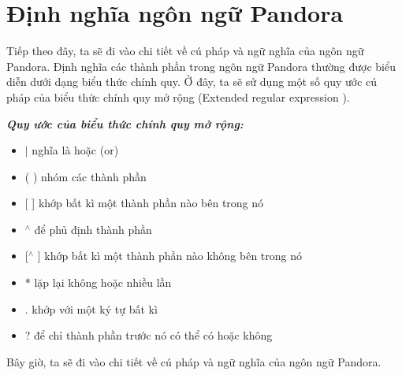 \section{Định nghĩa ngôn ngữ Pandora}

Tiếp theo đây, ta sẽ đi vào chi tiết về cú pháp và ngữ nghĩa của ngôn ngữ Pandora. Định nghĩa các thành phần trong ngôn ngữ Pandora thường được biểu diễn dưới dạng biểu thức chính quy\cite{li2008regular}. Ở đây, ta sẽ sử dụng một số quy ước cú pháp của biểu thức chính quy mở rộng (Extended regular expression \cite{freydenberger2013extended}).

\textbf{\textit{Quy ước của biểu thức chính quy mở rộng:}}

\begin{itemize}
    \item{$|$ nghĩa là hoặc (or)}
    \item{( ) nhóm các thành phần}
    \item{[ ] khớp bất kì một thành phần nào bên trong nó}
    \item{$^\wedge$ để phủ định thành phần}
    \item{[$^\wedge$ ] khớp bất kì một thành phần nào không bên trong nó}
    \item{* lặp lại không hoặc nhiều lần}
    \item{. khớp với một ký tự bất kì}
    \item{? để chỉ thành phần trước nó có thể có hoặc không}
\end{itemize}

Bây giờ, ta sẽ đi vào chi tiết về cú pháp và ngữ nghĩa của ngôn ngữ Pandora.







